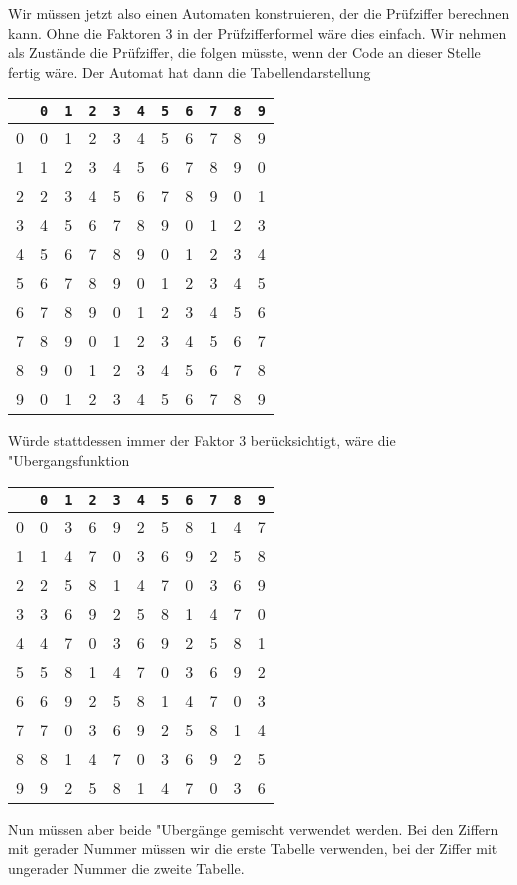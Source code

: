 \begin{loesung}
Wir müssen jetzt also einen Automaten konstruieren, der die
Prüfziffer berechnen kann.
Ohne die Faktoren $3$ in der Prüfzifferformel
wäre dies einfach. Wir nehmen als Zustände die Prüfziffer,
die folgen müsste, wenn der Code an dieser Stelle fertig wäre.
Der Automat hat dann die Tabellendarstellung
\begin{center}
\begin{tabular}{|c|cccccccccc|}
\hline
&{\tt 0} &{\tt 1} &{\tt 2} &{\tt 3} &{\tt 4} &{\tt 5} &{\tt 6} &{\tt 7} &{\tt 8} &{\tt 9}\\
\hline
0&0&1&2&3&4&5&6&7&8&9\\
1&1&2&3&4&5&6&7&8&9&0\\
2&2&3&4&5&6&7&8&9&0&1\\
3&4&5&6&7&8&9&0&1&2&3\\
4&5&6&7&8&9&0&1&2&3&4\\
5&6&7&8&9&0&1&2&3&4&5\\
6&7&8&9&0&1&2&3&4&5&6\\
7&8&9&0&1&2&3&4&5&6&7\\
8&9&0&1&2&3&4&5&6&7&8\\
9&0&1&2&3&4&5&6&7&8&9\\
\hline
\end{tabular}
\end{center}
Würde stattdessen immer der Faktor $3$ berücksichtigt, wäre
die "Ubergangsfunktion
\begin{center}
\begin{tabular}{|c|cccccccccc|}
\hline
&{\tt 0} &{\tt 1} &{\tt 2} &{\tt 3} &{\tt 4} &{\tt 5} &{\tt 6} &{\tt 7} &{\tt 8} &{\tt 9}\\
\hline
0&0&3&6&9&2&5&8&1&4&7\\
1&1&4&7&0&3&6&9&2&5&8\\
2&2&5&8&1&4&7&0&3&6&9\\
3&3&6&9&2&5&8&1&4&7&0\\
4&4&7&0&3&6&9&2&5&8&1\\
5&5&8&1&4&7&0&3&6&9&2\\
6&6&9&2&5&8&1&4&7&0&3\\
7&7&0&3&6&9&2&5&8&1&4\\
8&8&1&4&7&0&3&6&9&2&5\\
9&9&2&5&8&1&4&7&0&3&6\\
\hline
\end{tabular}
\end{center}
Nun müssen aber beide "Ubergänge gemischt verwendet werden.
Bei den Ziffern mit gerader Nummer müssen wir die erste Tabelle
verwenden, bei der Ziffer mit ungerader Nummer die zweite Tabelle.

\end{loesung}
